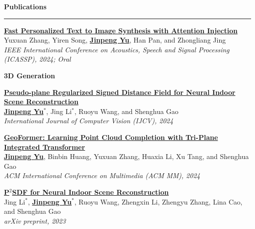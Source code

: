 \documentclass{resume}
\renewenvironment{rSection}[1]{
\sectionskip
\textcolor{DefaultBlack}{\bf #1}
\sectionlineskip
\hrule
\begin{list}{}{
\setlength{\leftmargin}{0em}
}
\item[]
}{
\end{list}
\vspace{-0.25em}
}
\newcommand{\pubentry}[3]{
{{\fontsize{10.8}{13}\selectfont\bfseries #1}}\\[-0.15em]
#2\\[-0.15em]
{\em #3}\par\vspace{0.3em}
}
\begin{document}
\begin{rSection}{Publications}
\pubentry{\href{https://arxiv.org/abs/2403.11284}{Fast Personalized Text to Image Synthesis with Attention Injection}}
{Yuxuan Zhang, Yiren Song, \underline{\bf Jinpeng Yu}, Han Pan, and Zhongliang Jing}
{IEEE International Conference on Acoustics, Speech and Signal Processing (ICASSP), 2024; Oral}

\textbf{3D Generation}

\pubentry{\href{https://jinpeng-yu.github.io/documents/PPlaneSDF.pdf}{Pseudo-plane Regularized Signed Distance Field for Neural Indoor Scene Reconstruction}}
{\underline{\bf Jinpeng Yu$^*$}, Jing Li$^*$, Ruoyu Wang, and Shenghua Gao}
{International Journal of Computer Vision (IJCV), 2024}

\pubentry{\href{https://arxiv.org/abs/2408.06596}{GeoFormer: Learning Point Cloud Completion with Tri-Plane Integrated Transformer}}
{\underline{\bf Jinpeng Yu}, Binbin Huang, Yuxuan Zhang, Huaxia Li, Xu Tang, and Shenghua Gao}
{ACM International Conference on Multimedia (ACM MM), 2024}

\pubentry{\href{https://arxiv.org/abs/2303.00236}{P$^2$SDF for Neural Indoor Scene Reconstruction}}
{Jing Li$^*$, \underline{\bf Jinpeng Yu$^*$}, Ruoyu Wang, Zhengxin Li, Zhengyu Zhang, Lina Cao, and Shenghua Gao}
{arXiv preprint, 2023}
\end{rSection}
\end{document}
